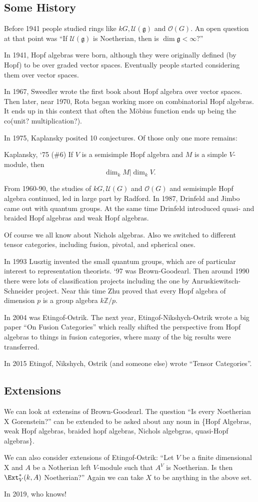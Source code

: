 \documentclass[12pt]{article}
\newcommand*{\g}{\mathfrak{g}}
\newcommand*{\Z}{
\mathbb{Z}
}
\begin{document}
\subsection{Some History}
Before 1941 people studied rings like $kG, \mathcal U(\g)$ and $\mathcal O(G)$. An open question at that
point was ``If $\mathcal U(\g)$ is Noetherian, then is $\dim \g<\infty?$''

In 1941, Hopf algebras were born, although they were originally defined (by Hopf) to be over graded
vector spaces. Eventually people started considering them over vector spaces.

In 1967, Sweedler wrote the first book about Hopf algebra over vector spaces. Then later, near 1970,
Rota began working more on combinatorial Hopf algebras. It ends up in this context that often the 
M\"obius function ends up being the co(unit? multiplication?).

In 1975, Kaplansky posited 10 conjectures. Of those only one more remains:
\begin{conj}{Kaplansky, `75 (\#6)}
	If $V$ is a semisimple Hopf algebra and $M$ is a simple $V$-module, then 
	\[\dim_kM|\dim_kV.\]
\end{conj}

From 1960-90, the studies of $kG, \mathcal U(G)$ and $\mathcal O(G)$ and semisimple Hopf algebra continued,
led in large part by Radford. In 1987, Drinfeld and Jimbo came out with quantum groups.
At the same time Drinfeld introduced quasi- and braided Hopf algebras and weak Hopf algebras.

Of course we all know about Nichols algebras. Also we switched to different tensor categories, including
fusion, pivotal, and spherical ones.

In 1993 Lusztig invented the small quantum groups, which are of particular interest to representation theorists.
`97 was Brown-Goodearl. Then around 1990 there were lots of classification projects including
the one by Anruskiewitsch-Schneider project. Near this time Zhu proved that every Hopf algebra of dimension $p$
is a group algebra $k\Z/p$. 

In 2004 was Etingof-Ostrik. The next year, Etingof-Nikshych-Ostrik wrote a big paper ``On Fusion Categories''
which really shifted the perspective from Hopf algebras to things in fusion categories, where many of the big
results were transferred.

In 2015 Etingof, Nikshych, Ostrik (and someone else) wrote ``Tensor Categories''.

\subsection{Extensions}
We can look at extensins of Brown-Goodearl. The question ``Is every Noetherian X Gorenstein?'' can be extended to be asked about any noun 
in \{Hopf Algebras, weak Hopf algebras, braided hopf algebras, Nichols algebgras, quasi-Hopf algebras\}.

We can also consider extensions of Etingof-Ostrik: ``Let $V$ be a finite dimensional X and $A$ be a 
Notherian left $V$-module such that $A^V$ is Noetherian. Is then $\Ext_V^*(k,A)$ Noetherian?'' Again
we can take $X$ to be anything in the above set.

In 2019, who knows!
\end{document}
